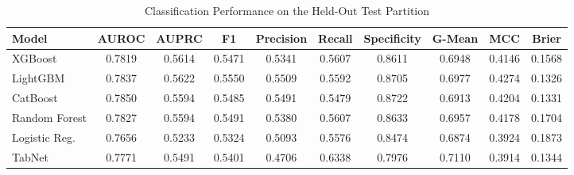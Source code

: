 \begin{table}
\centering
\caption{Classification Performance on the Held-Out Test Partition}
\label{tab:results}
\begin{tabular}{lccccccccc}
\toprule
Model & AUROC & AUPRC & F1 & Precision & Recall & Specificity & G-Mean & MCC & Brier \\
\midrule
XGBoost & 0.7819 & 0.5614 & 0.5471 & 0.5341 & 0.5607 & 0.8611 & 0.6948 & 0.4146 & 0.1568 \\
LightGBM & 0.7837 & 0.5622 & 0.5550 & 0.5509 & 0.5592 & 0.8705 & 0.6977 & 0.4274 & 0.1326 \\
CatBoost & 0.7850 & 0.5594 & 0.5485 & 0.5491 & 0.5479 & 0.8722 & 0.6913 & 0.4204 & 0.1331 \\
Random Forest & 0.7827 & 0.5594 & 0.5491 & 0.5380 & 0.5607 & 0.8633 & 0.6957 & 0.4178 & 0.1704 \\
Logistic Reg. & 0.7656 & 0.5233 & 0.5324 & 0.5093 & 0.5576 & 0.8474 & 0.6874 & 0.3924 & 0.1873 \\
TabNet & 0.7771 & 0.5491 & 0.5401 & 0.4706 & 0.6338 & 0.7976 & 0.7110 & 0.3914 & 0.1344 \\
\bottomrule
\end{tabular}
\end{table}
